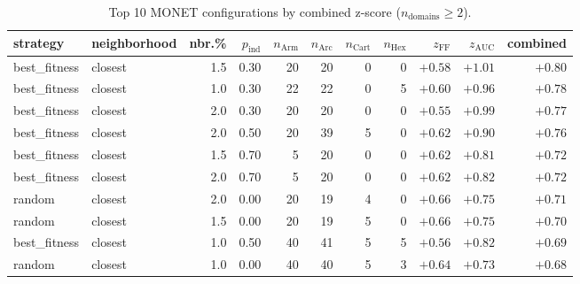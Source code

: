 \begin{table}[h]
\centering
\caption{Top 10 MONET configurations by combined z-score ($n_{\text{domains}} \ge 2$).}
\label{tab:top10}
\footnotesize
\setlength{\tabcolsep}{3pt}
\begin{tabular}{@{}llrrrrrrrrr@{}}
\toprule
strategy & neighborhood & nbr.\% & $p_\text{ind}$ & $n_\text{Arm}$ & $n_\text{Arc}$ & $n_\text{Cart}$ & $n_\text{Hex}$ & $z_{\text{FF}}$ & $z_{\text{AUC}}$ & combined \\
\midrule
best\_fitness & closest               & 1.5 & 0.30 & 20 & 20 &  0 &  0 & $+0.58$ & $+1.01$ & $\mathbf{+0.80}$ \\
best\_fitness & closest               & 1.0 & 0.30 & 22 & 22 &  0 &  5 & $+0.60$ & $+0.96$ & $+0.78$ \\
best\_fitness & closest               & 2.0 & 0.30 & 20 & 20 &  0 &  0 & $+0.55$ & $+0.99$ & $+0.77$ \\
best\_fitness & closest               & 2.0 & 0.50 & 20 & 39 &  5 &  0 & $+0.62$ & $+0.90$ & $+0.76$ \\
best\_fitness & closest               & 1.5 & 0.70 &  5 & 20 &  0 &  0 & $+0.62$ & $+0.81$ & $+0.72$ \\
best\_fitness & closest               & 2.0 & 0.70 &  5 & 20 &  0 &  0 & $+0.62$ & $+0.82$ & $+0.72$ \\
random        & closest               & 2.0 & 0.00 & 20 & 19 &  4 &  0 & $+0.66$ & $+0.75$ & $+0.71$ \\
random        & closest               & 1.5 & 0.00 & 20 & 19 &  5 &  0 & $+0.66$ & $+0.75$ & $+0.70$ \\
best\_fitness & closest               & 1.0 & 0.50 & 40 & 41 &  5 &  5 & $+0.56$ & $+0.82$ & $+0.69$ \\
random        & closest               & 1.0 & 0.00 & 40 & 40 &  5 &  3 & $+0.64$ & $+0.73$ & $+0.68$ \\
\bottomrule
\end{tabular}
\end{table}


